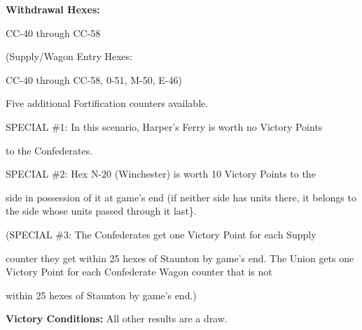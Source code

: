 \begin{scenariodata}
\textbf{Withdrawal Hexes:}\\
\end{scenariodata}

\begin{scenariodata}
CC-40 through CC-58\\
\end{scenariodata}

\begin{scenariodata}
(Supply/Wagon Entry Hexes:\\
\end{scenariodata}

\begin{scenariodata}
CC-40 through CC-58, 0-51, M-50, E-46)\\
\end{scenariodata}

Five additional Fortification counters available.

\begin{scenariodata}
SPECIAL \#1: In this scenario, Harper's Ferry is worth no Victory Points\\
\end{scenariodata}

to the Confederates.

\begin{scenariodata}
SPECIAL \#2: Hex N-20 (Winchester) is worth 10 Victory Points to the\\
\end{scenariodata}

side in possession of it at game's end (if neither side has units there, it belongs to the side whose units passed through it last\}.

\begin{scenariodata}
(SPECIAL \#3: The Confederates get one Victory Point for each Supply\\
\end{scenariodata}

counter they get within 25 hexes of Staunton by game's end. The Union gets one Victory Point for each Confederate Wagon counter that is not

\begin{scenariodata}
within 25 hexes of Staunton by game's end.)\\
\end{scenariodata}

\begin{scenariodata}
\textbf{Victory Conditions:} All other results are a draw.\\
\end{scenariodata}

